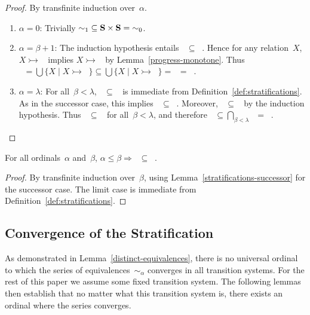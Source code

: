 \documentclass{CSML}
\theoremstyle{definition}
\newcommand{\progress}{\rightarrowtail}
\begin{document}
\begin{proof}
By transfinite induction over~$\alpha$.
\begin{enumerate}
\item $\alpha = 0$: Trivially $\mathop{\sim_1} \subseteq {\bf S}
  \times {\bf S} = \mathop{\sim_0}$.
\item $\alpha = \beta+1$: The induction hypothesis entails
  $\mathop{\sim_{\beta+1}} \subseteq \mathop{\sim_\beta}$.  Hence for
  any relation~$X$, $X \progress \mathop{\sim_{\beta+1}}$ implies $X
  \progress \mathop{\sim_\beta}$ by Lemma~\ref{progress-monotone}.
  Thus $\mathop{\sim_{\alpha+1}} = \bigcup\{X \mid X \progress
  \mathop{\sim_{\beta+1}}\} \subseteq \bigcup \{X \mid X \progress
  \mathop{\sim_\beta}\} = \mathop{\sim_{\beta+1}} =
  \mathop{\sim_\alpha}$.
\item $\alpha = \lambda$: For all~$\beta < \lambda$,
  $\mathop{\sim_\lambda} \subseteq \mathop{\sim_\beta}$ is immediate
  from Definition~\ref{def:stratifications}.  As in the successor
  case, this implies $\mathop{\sim_{\lambda+1}} \subseteq
  \mathop{\sim_{\beta+1}}$.  Moreover, $\mathop{\sim_{\beta+1}}
  \subseteq \mathop{\sim_\beta}$ by the induction hypothesis.  Thus
  $\mathop{\sim_{\lambda+1}} \subseteq \mathop{\sim_\beta}$ for
  all~$\beta < \lambda$, and therefore $\mathop{\sim_{\lambda+1}}
  \subseteq \bigcap_{\beta < \lambda} \mathop{\sim_\beta} =
  \mathop{\sim_\lambda}$.\qedhere
\end{enumerate}
\end{proof}

\begin{lem}
\label{stratifications-subset}
For all ordinals~$\alpha$ and~$\beta$, $\alpha \leq \beta
\Longrightarrow \mathop{\sim_\beta} \subseteq \mathop{\sim_\alpha}$.
\end{lem}

\begin{proof}
By transfinite induction over~$\beta$, using
Lemma~\ref{stratifications-successor} for the successor case.  The
limit case is immediate from Definition~\ref{def:stratifications}.
\end{proof}

\subsection{Convergence of the Stratification}

As demonstrated in Lemma~\ref{distinct-equivalences}, there is no
universal ordinal to which the series of equivalences~$\sim_\alpha$
converges in all transition systems.  For the rest of this paper we
assume some fixed transition system.  The following lemmas then
establish that no matter what this transition system is, there exists
an ordinal where the series converges.
\end{document}
